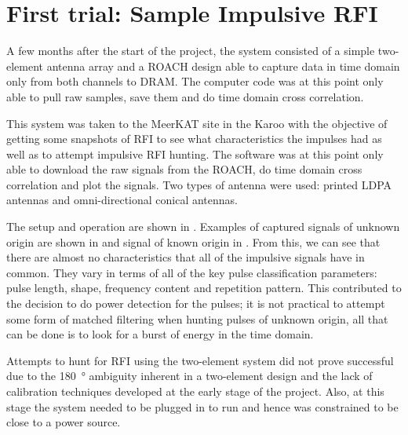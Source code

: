 \section{First trial: Sample Impulsive RFI}

A few months after the start of the project, the system consisted of a simple two-element antenna array and a ROACH design able to capture data in time domain only from both channels to DRAM. The computer code was at this point only able to pull raw samples, save them and do time domain cross correlation. 

This system was taken to the MeerKAT site in the Karoo with the objective of getting some snapshots of RFI to see what characteristics the impulses had as well as to attempt impulsive RFI hunting. The software was at this point only able to download the raw signals from the ROACH, do time domain cross correlation and plot the signals. Two types of antenna were used: printed LDPA antennas and omni-directional conical antennas.

The setup and operation are shown in . Examples of captured signals of unknown origin are shown in  and signal of known origin in . From this, we can see that there are almost no characteristics that all of the impulsive signals have in common. They vary in terms of all of the key pulse classification parameters: pulse length, shape, frequency content and repetition pattern. This contributed to the decision to do power detection for the pulses; it is not practical to attempt some form of matched filtering when hunting pulses of unknown origin, all that can be done is to look for a burst of energy in the time domain.

Attempts to hunt for RFI using the two-element system did not prove successful due to the \SI{180}{\degree} ambiguity inherent in a two-element design and the lack of calibration techniques developed at the early stage of the project. Also, at this stage the system needed to be plugged in to run and hence was constrained to be close to a power source.

